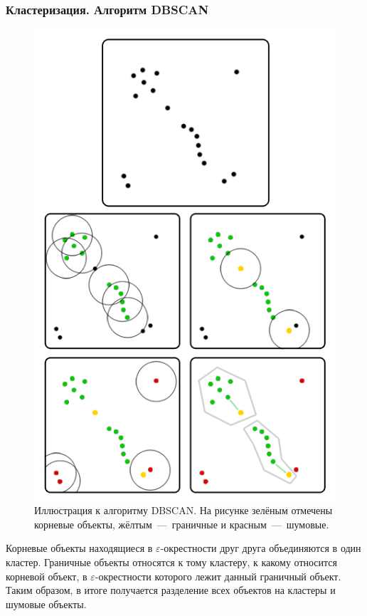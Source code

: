\documentclass[ucs, notheorems, handout]{beamer}
\begin{document}
	\begin{frame}
	\frametitle{Кластеризация. Алгоритм DBSCAN}
	
	\begin{figure}[H]
		\begin{center}
			\includegraphics[scale = 1.1]{dbscan.png}
			\caption{Иллюстрация к алгоритму DBSCAN. На рисунке зелёным отмечены корневые объекты, жёлтым~---~граничные и красным~---~шумовые.}
		\end{center}
	\end{figure}
	Корневые объекты находящиеся в $\varepsilon$-окрестности друг друга объединяются в один кластер. Граничные объекты относятся к тому кластеру, к какому относится корневой
	объект, в $\varepsilon$-окрестности которого лежит данный граничный объект. Таким образом, в итоге получается разделение всех объектов на кластеры и шумовые объекты.

	\end{frame}
	
\end{document}
